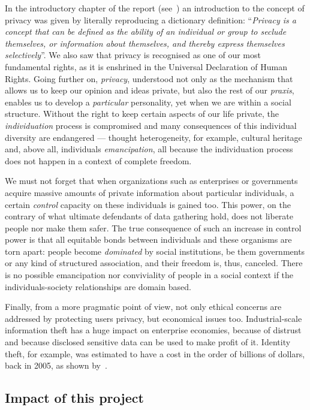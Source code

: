 In the introductory chapter of the report (see~) an introduction to the concept of privacy was given by literally reproducing a dictionary definition: ``\textit{Privacy is a concept that can be defined as the ability of an individual or group to seclude themselves, or information about themselves, and thereby express themselves selectively}''. We also saw that privacy is recognised as one of our most fundamental rights, as it is enshrined in the Universal Declaration of Human Rights. Going further on, \textit{privacy}, understood not only as the mechanism that allows us to keep our opinion and ideas private, but also the rest of our \textit{praxis}, enables us to develop a \textit{particular} personality, yet when we are within a social structure. Without the right to keep certain aspects of our life private, the \textit{individuation} process is compromised and many consequences of this individual diversity are endangered --- thought heterogeneity, for example, cultural heritage and, above all, individuals \textit{emancipation}, all because the individuation process does not happen in a context of complete freedom.

We must not forget that when organizations such as enterprises or governments acquire massive amounts of private information about particular individuals, a certain \textit{control} capacity on these individuals is gained too. This power, on the contrary of what ultimate defendants of data gathering hold, does not liberate people nor make them safer. The true consequence of such an increase in control power is that all equitable bonds between individuals and these organisms are torn apart: people become \textit{dominated} by social institutions, be them governments or any kind of structured association, and their freedom is, thus, canceled. There is no possible emancipation nor conviviality of people in a social context if the individuals-society relationships are domain based.

Finally, from a more pragmatic point of view, not only ethical concerns are addressed by protecting users privacy, but economical issues too. Industrial-scale information theft has a huge impact on enterprise economies, because of distrust and because disclosed sensitive data can be used to make profit of it. Identity theft, for example, was estimated to have a cost in the order of billions of dollars, back in 2005, as shown by~\citet{Romanosky:DisclosureLaws}.

\subsection{Impact of this project}
\label{Practical::Privacy:Impact}

